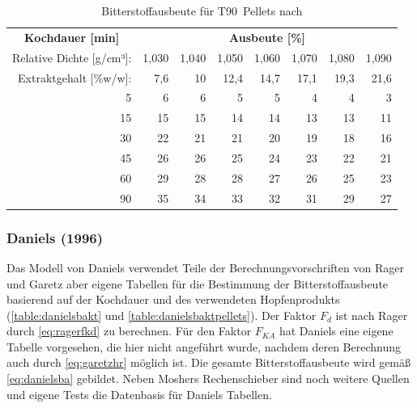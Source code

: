 \documentclass[a4paper,parskip=half]{scrartcl}
\newcommand{\FKd}{F_{\mathit{d}}}
\newcommand{\FHR}{F_{\mathit{KA}}}
\begin{document}
\begin{table}[H]
\centering
\begin{tabular}{rrrrrrrr} 
\toprule
\multicolumn{1}{c}{\textbf{Kochdauer [min]}} & \multicolumn{7}{c}{\textbf{Ausbeute [\%]}}  \\
Relative Dichte [g/cm³]:                                        & 1,030 & 1,040 & 1,050 & 1,060 & 1,070 & 1,080  & 1,090                   \\
Extraktgehalt [\%w/w]:                                            & 7,6 & 10 & 12,4 & 14,7 & 17,1 & 19,3  & 21,6                   \\  
\midrule
5                                            & 6     & 6     & 5     & 5     & 4     & 4      & 3                          \\
15                                           & 15    & 15    & 14    & 14    & 13    & 13     & 11                         \\
30                                           & 22    & 21    & 21    & 20    & 19    & 18     & 16                         \\
45                                           & 26    & 26    & 25    & 24    & 23    & 22     & 21                         \\
60                                           & 29    & 28    & 28    & 27    & 26    & 25     & 23                         \\
90                                           & 35    & 34    & 33    & 32    & 31    & 29     & 27                         \\
\bottomrule
\end{tabular}
\caption{Bitterstoffausbeute für T90~Pellets nach \citeauthor{Mosher1994} \parencite[51]{Holle2010}}
\label{table:mosherbaktpellets}
\end{table}

\subsubsection*{Daniels (1996)}

Das Modell von Daniels verwendet Teile der Berechnungsvorschriften von Rager und Garetz aber eigene Tabellen für die Bestimmung der Bitterstoffausbeute basierend auf der Kochdauer und des verwendeten Hopfenprodukts (\autoref{table:danielsbakt} und \autoref{table:danielsbaktpellets}). Der Faktor $\FKd$ ist nach Rager durch \autoref{eq:ragerfkd} zu berechnen. Für den Faktor $\FHR$ hat Daniels eine eigene Tabelle vorgesehen, die hier nicht angeführt wurde, nachdem deren Berechnung auch durch \autoref{eq:garetzhr} möglich ist. Die gesamte Bitterstoffausbeute wird gemäß \autoref{eq:danielsba} gebildet. Neben Moshers Rechenschieber sind noch weitere Quellen und eigene Tests die Datenbasis für Daniels Tabellen. \parencite[80,85-88]{Daniels1996}
\end{document}
